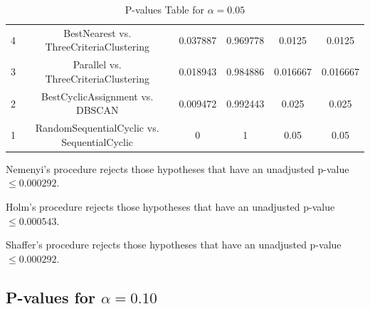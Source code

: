 \documentclass[a4paper,10pt]{article}
\begin{document}
\begin{landscape}
\begin{table}[!htp]
\begin{tabular}{cccccc}
4&BestNearest vs. ThreeCriteriaClustering&0.037887&0.969778&0.0125&0.0125\\
3&Parallel vs. ThreeCriteriaClustering&0.018943&0.984886&0.016667&0.016667\\
2&BestCyclicAssignment vs. DBSCAN&0.009472&0.992443&0.025&0.025\\
1&RandomSequentialCyclic vs. SequentialCyclic&0&1&0.05&0.05\\
\hline
\end{tabular}
\caption{P-values Table for $\alpha=0.05$}
\end{table}Nemenyi's procedure rejects those hypotheses that have an unadjusted p-value $\le0.000292$.

Holm's procedure rejects those hypotheses that have an unadjusted p-value $\le0.000543$.

Shaffer's procedure rejects those hypotheses that have an unadjusted p-value $\le0.000292$.

\pagebreak

\subsection{P-values for $\alpha=0.10$}


\end{landscape}
\end{document}
